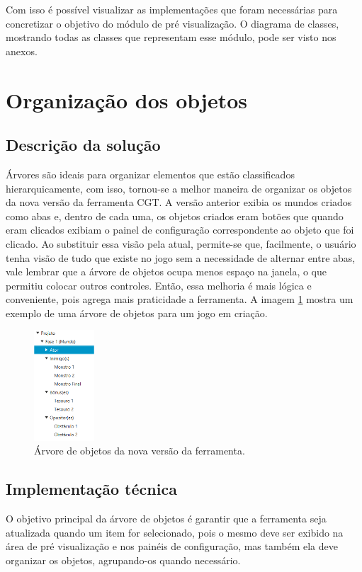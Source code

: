 \documentclass[12pt,oneside,openright,a4paper,english,brazil,sumario=tradicional]{abntex2}
\begin{document}
Com isso é possível visualizar as implementações que foram necessárias para concretizar o objetivo do módulo de pré visualização. O diagrama de classes, mostrando todas as classes que representam esse módulo, pode ser visto nos anexos.

\section{Organização dos objetos}

\subsection{Descrição da solução}
Árvores são ideais para organizar elementos que estão classificados hierarquicamente, com isso, tornou-se a melhor maneira de organizar os objetos da nova versão da ferramenta CGT.
A versão anterior exibia os mundos criados como abas e, dentro de cada uma, os objetos criados eram botões que quando eram clicados exibiam o painel de configuração correspondente ao objeto que foi clicado.
Ao substituir essa visão pela atual, permite-se que, facilmente, o usuário tenha visão de tudo que existe no jogo sem a necessidade de alternar entre abas, vale lembrar que a árvore de objetos ocupa menos espaço na janela, o que permitiu colocar outros controles.
Então, essa melhoria é mais lógica e conveniente, pois agrega mais praticidade a ferramenta.
A imagem \ref{fig:arvore_objetos} mostra um exemplo de uma árvore de objetos para um jogo em criação.

\begin{figure}[h]
\centering
\includegraphics[width=0.2\textwidth]{images/arvore_objetos.png}
\caption{Árvore de objetos da nova versão da ferramenta.}
\label{fig:arvore_objetos}
\end{figure}

\subsection{Implementação técnica}
O objetivo principal da árvore de objetos é garantir que a ferramenta seja atualizada quando um item for selecionado, pois o mesmo deve ser exibido na área de pré visualização e nos painéis de configuração, mas também ela deve organizar os objetos, agrupando-os quando necessário.
\end{document}

